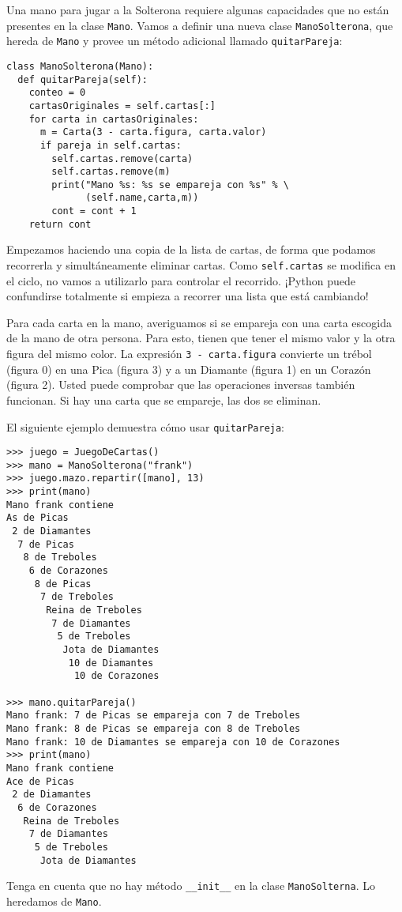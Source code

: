 
Una mano para jugar a la Solterona requiere algunas capacidades que
no están presentes en la clase \texttt{Mano}. Vamos a definir una
nueva clase \texttt{ManoSolterona}, que hereda de \texttt{Mano} y
provee un método adicional llamado \texttt{quitarPareja}:

\begin{verbatim}
class ManoSolterona(Mano):
  def quitarPareja(self):
    conteo = 0
    cartasOriginales = self.cartas[:]
    for carta in cartasOriginales:
      m = Carta(3 - carta.figura, carta.valor)
      if pareja in self.cartas:
        self.cartas.remove(carta)
        self.cartas.remove(m)
        print("Mano %s: %s se empareja con %s" % \
              (self.name,carta,m))
        cont = cont + 1
    return cont
\end{verbatim}
 Empezamos haciendo una copia de la lista de cartas, de forma que
podamos recorrerla y simultáneamente eliminar cartas. Como \texttt{self.cartas}
se modifica en el ciclo, no vamos a utilizarlo para controlar el recorrido.
¡Python puede confundirse totalmente si empieza a recorrer una lista
que está cambiando!


Para cada carta en la mano, averiguamos si se empareja con una carta
escogida de la mano de otra persona. Para esto, tienen que tener el
mismo valor y la otra figura del mismo color. La expresión \texttt{3
- carta.figura} convierte un trébol (figura 0) en una Pica (figura
3) y a un Diamante (figura 1) en un Corazón (figura 2). Usted puede
comprobar que las operaciones inversas también funcionan. Si hay una
carta que se empareje, las dos se eliminan.

El siguiente ejemplo demuestra cómo usar \texttt{quitarPareja}:

\begin{verbatim}
>>> juego = JuegoDeCartas()
>>> mano = ManoSolterona("frank")
>>> juego.mazo.repartir([mano], 13)
>>> print(mano)
Mano frank contiene
As de Picas
 2 de Diamantes
  7 de Picas
   8 de Treboles
    6 de Corazones
     8 de Picas
      7 de Treboles
       Reina de Treboles
        7 de Diamantes
         5 de Treboles
          Jota de Diamantes
           10 de Diamantes
            10 de Corazones

>>> mano.quitarPareja()
Mano frank: 7 de Picas se empareja con 7 de Treboles
Mano frank: 8 de Picas se empareja con 8 de Treboles
Mano frank: 10 de Diamantes se empareja con 10 de Corazones
>>> print(mano)
Mano frank contiene
Ace de Picas
 2 de Diamantes
  6 de Corazones
   Reina de Treboles
    7 de Diamantes
     5 de Treboles
      Jota de Diamantes
\end{verbatim}
 Tenga en cuenta que no hay método \texttt{\_\_init\_\_} en la clase
\texttt{ManoSolterna}. Lo heredamos de \texttt{Mano}.

